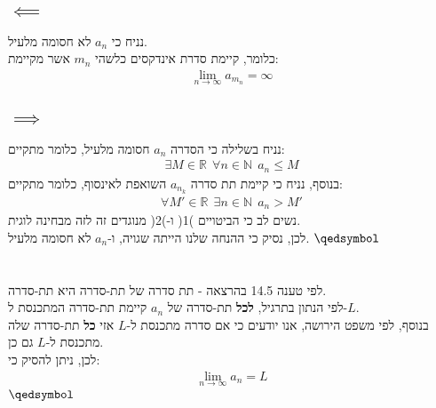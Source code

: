 \documentclass[a4paper, 12pt, leqno]{article}
\newcommand{\sub}[1]{\subsection{\underline{#1}}}
\newcommand{\RR}{\mathbb{R}}
\newcommand{\N}{\ensuremath{\mathbb{N}}}
\newcommand{\eq}[1]{\begin{align*}#1\end{align*}}
\newcommand{\eqn}[1]{\begin{align}#1\end{align}}
\renewcommand{\qed}{\hfill\(\qedsymbol\)}
\renewcommand{\leq}{\leqslant}
\newcommand{\limn}{\lim_{n\to\infty}}
\begin{document}
\pagebreak
\setcounter{equation}{0}
\section{}
\sub{$\impliedby$}
נניח כי $a_n$ לא חסומה מלעיל.\\
כלומר, קיימת סדרת אינדקסים כלשהי $m_n$ אשר מקיימת:
\eq{
    \limn{a_{m_n}}=\infty
}
\sub{$\implies$}
נניח בשלילה כי הסדרה $a_n$ חסומה מלעיל, כלומר מתקיים:
\eqn{
    \exists{M}\in\RR~~\forall{n}\in\N~~a_n\leq{M}
}
בנוסף, נניח כי קיימת תת סדרה $a_{n_k}$ השואפת לאינסוף, כלומר מתקיים:
\eqn{
    \forall{M'}\in\RR~~\exists{n}\in\N~~a_n>M'
}
נשים לב כי הביטויים )1( ו-)2( מנוגדים זה לזה מבחינה לוגית.\\
לכן, נסיק כי ההנחה שלנו הייתה שגויה, ו-$a_n$ לא חסומה מלעיל.
\qed

\section{}
לפי טענה 14.5 בהרצאה - תת סדרה של תת-סדרה היא תת-סדרה.\\
לפי הנתון בתרגיל, \textbf{לכל} תת-סדרה של $a_n$ קיימת תת-סדרה המתכנסת ל-$L$.\\
בנוסף, לפי משפט הירושה, אנו יודעים כי אם סדרה מתכנסת ל-$L$ אזי \textbf{כל} תת-סדרה שלה מתכנסת ל-$L$ גם כן.\\
לכן, ניתן להסיק כי:
\eq{
    \limn{a_n}=L
}
\qed


\end{document}
